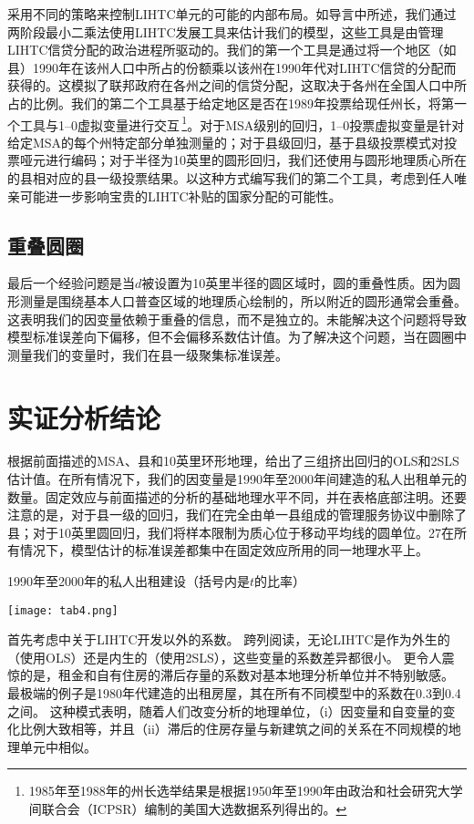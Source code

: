 \documentclass[lang=cn,11pt,a4paper]{paper}
\begin{document}
采用不同的策略来控制LIHTC单元的可能的内部布局。如导言中所述，我们通过两阶段最小二乘法使用LIHTC发展工具来估计我们的模型，这些工具是由管理LIHTC信贷分配的政治进程所驱动的。我们的第一个工具是通过将一个地区（如县）1990年在该州人口中所占的份额乘以该州在1990年代对LIHTC信贷的分配而获得的。这模拟了联邦政府在各州之间的信贷分配，这取决于各州在全国人口中所占的比例。我们的第二个工具基于给定地区是否在1989年投票给现任州长，将第一个工具与1–0虚拟变量进行交互\,\footnote{1985年至1988年的州长选举结果是根据1950年至1990年由政治和社会研究大学间联合会（ICPSR）编制的美国大选数据系列得出的。}。对于MSA级别的回归，1–0投票虚拟变量是针对给定MSA的每个州特定部分单独测量的；对于县级回归，基于县级投票模式对投票哑元进行编码；对于半径为10英里的圆形回归，我们还使用与圆形地理质心所在的县相对应的县一级投票结果。以这种方式编写我们的第二个工具，考虑到任人唯亲可能进一步影响宝贵的LIHTC补贴的国家分配的可能性。

\subsection{重叠圆圈}

最后一个经验问题是当$d$被设置为10英里半径的圆区域时，圆的重叠性质。因为圆形测量是围绕基本人口普查区域的地理质心绘制的，所以附近的圆形通常会重叠。这表明我们的因变量依赖于重叠的信息，而不是独立的。未能解决这个问题将导致模型标准误差向下偏移，但不会偏移系数估计值。为了解决这个问题，当在圆圈中测量我们的变量时，我们在县一级聚集标准误差。

\section{实证分析结论}\label{sec5}

根据前面描述的MSA、县和10英里环形地理，给出了三组挤出回归的OLS和2SLS估计值。在所有情况下，我们的因变量是1990年至2000年间建造的私人出租单元的数量。固定效应与前面描述的分析的基础地理水平不同，并在表格底部注明。还要注意的是，对于县一级的回归，我们在完全由单一县组成的管理服务协议中删除了县；对于10英里圆回归，我们将样本限制为质心位于移动平均线的圆单位。27在所有情况下，模型估计的标准误差都集中在固定效应所用的同一地理水平上。

\begin{table}[h]
  \caption{1990年至2000年的私人出租建设（括号内是$t$的比率）}\label{tab4}
	\centering
	\texttt{[image: tab4.png]}
\end{table}
  
首先考虑中关于LIHTC开发以外的系数。 跨列阅读，无论LIHTC是作为外生的（使用OLS）还是内生的（使用2SLS），这些变量的系数差异都很小。 更令人震惊的是，租金和自有住房的滞后存量的系数对基本地理分析单位并不特别敏感。 最极端的例子是1980年代建造的出租房屋，其在所有不同模型中的系数在0.3到0.4之间。 这种模式表明，随着人们改变分析的地理单位，（i）因变量和自变量的变化比例大致相等，并且（ii）滞后的住房存量与新建筑之间的关系在不同规模的地理单元中相似。
\end{document}
